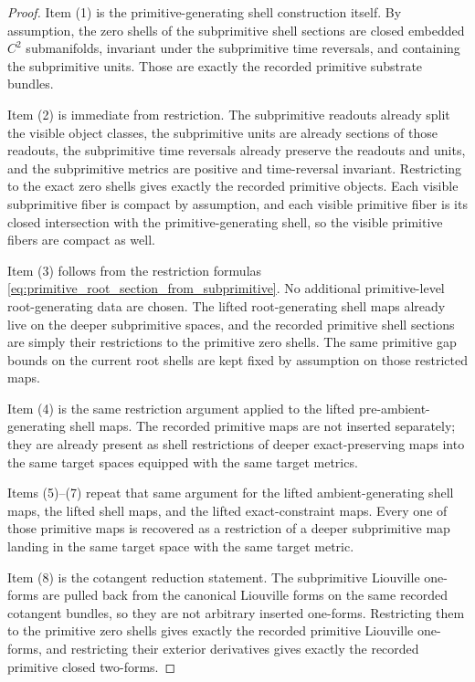 \documentclass[11pt]{article}
\begin{document}
\begin{proof}
Item (1) is the primitive-generating shell construction itself. By assumption, the zero shells of the subprimitive shell sections are closed embedded \(C^2\) submanifolds, invariant under the subprimitive time reversals, and containing the subprimitive units. Those are exactly the recorded primitive substrate bundles.

Item (2) is immediate from restriction. The subprimitive readouts already split the visible object classes, the subprimitive units are already sections of those readouts, the subprimitive time reversals already preserve the readouts and units, and the subprimitive metrics are positive and time-reversal invariant. Restricting to the exact zero shells gives exactly the recorded primitive objects. Each visible subprimitive fiber is compact by assumption, and each visible primitive fiber is its closed intersection with the primitive-generating shell, so the visible primitive fibers are compact as well.

Item (3) follows from the restriction formulas \eqref{eq:primitive_root_section_from_subprimitive}. No additional primitive-level root-generating data are chosen. The lifted root-generating shell maps already live on the deeper subprimitive spaces, and the recorded primitive shell sections are simply their restrictions to the primitive zero shells. The same primitive gap bounds on the current root shells are kept fixed by assumption on those restricted maps.

Item (4) is the same restriction argument applied to the lifted pre-ambient-generating shell maps. The recorded primitive maps are not inserted separately; they are already present as shell restrictions of deeper exact-preserving maps into the same target spaces equipped with the same target metrics.

Items (5)--(7) repeat that same argument for the lifted ambient-generating shell maps, the lifted shell maps, and the lifted exact-constraint maps. Every one of those primitive maps is recovered as a restriction of a deeper subprimitive map landing in the same target space with the same target metric.

Item (8) is the cotangent reduction statement. The subprimitive Liouville one-forms are pulled back from the canonical Liouville forms on the same recorded cotangent bundles, so they are not arbitrary inserted one-forms. Restricting them to the primitive zero shells gives exactly the recorded primitive Liouville one-forms, and restricting their exterior derivatives gives exactly the recorded primitive closed two-forms.


\end{proof}
\end{document}
